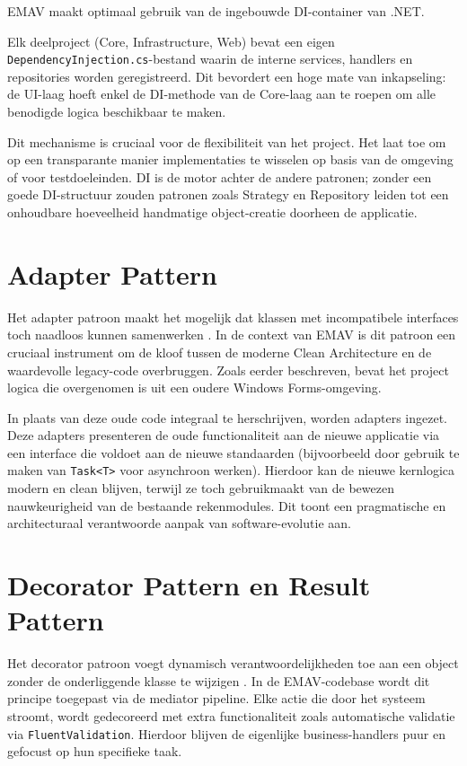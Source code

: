 EMAV maakt optimaal gebruik van de ingebouwde DI-container van .NET. 
{\sloppy Elk deelproject (Core, Infrastructure, Web) bevat een eigen \nolinkurl{DependencyInjection.cs}-bestand waarin de interne services, handlers en repositories worden geregistreerd. Dit bevordert een hoge mate van inkapseling: de UI-laag hoeft enkel de DI-methode van de Core-laag aan te roepen om alle benodigde logica beschikbaar te maken.\par}

Dit mechanisme is cruciaal voor de flexibiliteit van het project. 
Het laat toe om op een transparante manier implementaties te wisselen op basis van de omgeving of voor testdoeleinden. 
DI is de motor achter de andere patronen; zonder een goede DI-structuur zouden patronen zoals Strategy en Repository leiden tot een onhoudbare hoeveelheid handmatige object-creatie doorheen de applicatie.

\section{Adapter Pattern}
Het adapter patroon maakt het mogelijk dat klassen met incompatibele interfaces toch naadloos kunnen samenwerken \autocite{gof1994}. 
In de context van EMAV is dit patroon een cruciaal instrument om de kloof tussen de moderne Clean Architecture en de waardevolle legacy-code overbruggen. 
Zoals eerder beschreven, bevat het project logica die overgenomen is uit een oudere Windows Forms-omgeving.

In plaats van deze oude code integraal te herschrijven, worden adapters ingezet. 
Deze adapters presenteren de oude functionaliteit aan de nieuwe applicatie via een interface die voldoet aan de nieuwe standaarden (bijvoorbeeld door gebruik te maken van \texttt{Task<T>} voor asynchroon werken). 
Hierdoor kan de nieuwe kernlogica modern en clean blijven, terwijl ze toch gebruikmaakt van de bewezen nauwkeurigheid van de bestaande rekenmodules. 
Dit toont een pragmatische en architecturaal verantwoorde aanpak van software-evolutie aan.

\section{Decorator Pattern en Result Pattern}
Het decorator patroon voegt dynamisch verantwoordelijkheden toe aan een object zonder de onderliggende klasse te wijzigen \autocite{gof1994}. 
In de EMAV-codebase wordt dit principe toegepast via de mediator pipeline. 
Elke actie die door het systeem stroomt, wordt gedecoreerd met extra functionaliteit zoals automatische validatie via \texttt{FluentValidation}. 
Hierdoor blijven de eigenlijke business-handlers puur en gefocust op hun specifieke taak.


